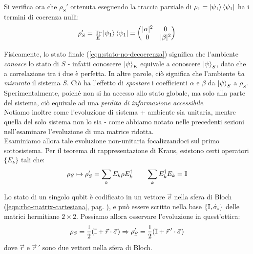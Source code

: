 \documentclass[../../InformazioneQuantistica.tex]{subfiles}
\begin{document}
Si verifica ora che $\rho_S'$ ottenuta eseguendo la traccia parziale di $\rho_1 = \Ket{\psi_1}\Bra{\psi_1}$ ha i termini di coerenza nulli:
\begin{align*}
\rho'_S = \underset{E}{\operatorname{Tr}} \Ket{\psi_1}\Bra{\psi_1} = \begin{pmatrix}|\alpha|^2 & 0\\ 0 & |\beta|^2\end{pmatrix}
\end{align*}

Fisicamente, lo stato finale (\ref{eqn:stato-no-decoerenza}) significa che l'ambiente \textit{conosce} lo stato di $S$ - infatti conoscere $\Ket{\psi}_E$ equivale a conoscere $\Ket{\psi}_S$, dato che a correlazione tra i due è perfetta. In altre parole, ciò significa che l'ambiente \textit{ha misurato} il sistema $S$. Ciò ha l'effetto di \textit{spostare} i coefficienti $\alpha$ e $\beta$ da $\Ket{\psi}_S$ a $\rho_S$. Sperimentalmente, poiché non si ha accesso allo stato globale, ma solo alla parte del sistema, ciò equivale ad una \textit{perdita di informazione accessibile}.\\

Notiamo inoltre come l'evoluzione di sistema + ambiente sia unitaria, mentre quella del solo sistema non lo sia - come abbiamo notato nelle precedenti sezioni nell'esaminare l'evoluzione di una matrice ridotta.\\
Esaminiamo allora tale evoluzione non-unitaria  focalizzandoci sul primo sottosistema. Per il teorema di rappresentazione di Kraus, esistono certi operatori $\{E_k\}$ tali che:
\begin{align}
\rho_S \mapsto \rho'_S = \sum_{k} E_k \rho E_k^\dag \qquad \sum_k E_k^\dag E_k = \mathbb{I}
\label{eqn:ev-kraus}
\end{align}

Lo stato di un singolo qubit è codificato in un vettore $\vec{v}$ nella sfera di Bloch (\ref{eqn:rho-matrix-cartesiana}, pag. \pageref{eqn:rho-matrix-cartesiana}), e può essere scritto nella base $\{\mathbb{I}, \hat{\sigma}_i\}$ delle matrici hermitiane $2\times 2$. Possiamo allora osservare l'evoluzione in quest'ottica:
\begin{align}
\rho_S = \frac{1}{2}(\mathbb{I}+\vec{r}\cdot \vec{\sigma}) \Rightarrow  \rho'_S =\frac{1}{2}(\mathbb{I}+\vec{r}\,'\cdot \vec{\sigma})
\label{eqn:ev-vector}
\end{align}
dove $\vec{r}$ e $\vec{r}\,'$ sono due vettori nella sfera di Bloch.\\
\end{document}
